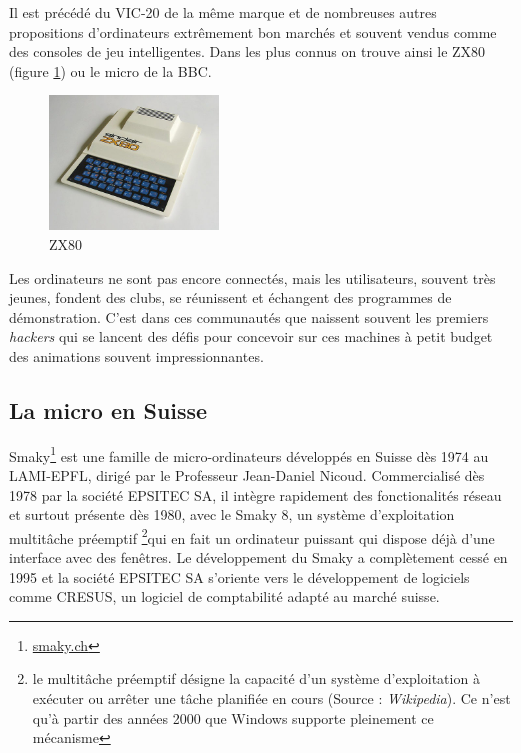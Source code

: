 \documentclass[a4paper,11pt]{book}
\begin{document}
Il est précédé du VIC-20 de la même marque et de nombreuses autres propositions d'ordinateurs extrêmement bon marchés et souvent vendus comme des consoles de jeu \guillemotleft intelligentes\guillemotright. Dans les plus connus on trouve ainsi le ZX80 (figure \ref{zx80}) ou le micro de la BBC.

\begin{figure}[h]
    \centering
    \includegraphics[width=0.4\textwidth]{media/machines/520px-ZX80.jpeg}
    \caption{ZX80}
    \label{zx80}
\end{figure}

Les ordinateurs ne sont pas encore connectés, mais les utilisateurs, souvent très jeunes, fondent des clubs, se réunissent et échangent des programmes de démonstration. C'est dans ces communautés que naissent souvent les premiers \textit{hackers} qui se lancent des défis pour concevoir sur ces machines à petit budget des animations souvent impressionnantes.

\subsection{La micro en Suisse}
Smaky\footnote{\url{smaky.ch}} est une famille de micro-ordinateurs développés en Suisse dès 1974 au LAMI-EPFL, dirigé par le Professeur Jean-Daniel Nicoud. Commercialisé dès 1978 par la société EPSITEC SA, il intègre rapidement des fonctionalités réseau et surtout présente dès 1980, avec le Smaky 8, un système d'exploitation multitâche préemptif \footnote{le multitâche préemptif désigne la capacité d'un système d'exploitation à exécuter ou arrêter une tâche planifiée en cours (Source : \textit{Wikipedia}). Ce n'est qu'à partir des années 2000 que Windows supporte pleinement ce mécanisme}qui en fait un ordinateur puissant qui dispose déjà d'une interface avec des fenêtres. Le développement du Smaky a complètement cessé en 1995 et la société EPSITEC SA s'oriente vers le développement de logiciels comme CRESUS, un logiciel de comptabilité adapté au marché suisse.
\end{document}
